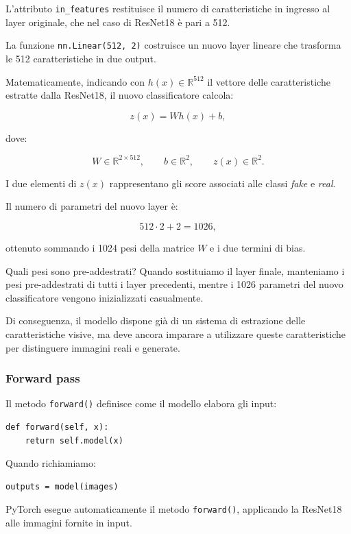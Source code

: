 \documentclass[10pt,a4paper,oneside]{book}
\begin{document}
L'attributo \texttt{in\_features} restituisce il numero
di caratteristiche in ingresso al layer originale,
che nel caso di ResNet18 è pari a 512.

La funzione \texttt{nn.Linear(512, 2)} costruisce
un nuovo layer lineare che trasforma le 512 caratteristiche
in due output.

Matematicamente, indicando con
$h(x)\in\mathbb{R}^{512}$ il vettore delle
caratteristiche estratte dalla ResNet18, il nuovo
classificatore calcola:

\[
z(x)=Wh(x)+b,
\]

dove:

\[
W\in\mathbb{R}^{2\times512},
\qquad
b\in\mathbb{R}^{2},
\qquad
z(x)\in\mathbb{R}^{2}.
\]

I due elementi di $z(x)$ rappresentano gli score
associati alle classi \textit{fake} e \textit{real}.

Il numero di parametri del nuovo layer è:

\[
512\cdot2+2=1026,
\]

ottenuto sommando i 1024 pesi della matrice $W$
e i due termini di bias.

\begin{importantbox}{Quali pesi sono pre-addestrati?}
Quando sostituiamo il layer finale, manteniamo i
pesi pre-addestrati di tutti i layer precedenti,
mentre i 1026 parametri del nuovo classificatore
vengono inizializzati casualmente.

Di conseguenza, il modello dispone già di un sistema
di estrazione delle caratteristiche visive, ma deve
ancora imparare a utilizzare queste caratteristiche
per distinguere immagini reali e generate.
\end{importantbox}

\subsubsection{Forward pass}

Il metodo \texttt{forward()} definisce come il modello
elabora gli input:

\begin{verbatim}
def forward(self, x):
    return self.model(x)
\end{verbatim}

Quando richiamiamo:

\begin{verbatim}
outputs = model(images)
\end{verbatim}

PyTorch esegue automaticamente il metodo
\texttt{forward()}, applicando la ResNet18
alle immagini fornite in input.
\end{document}
